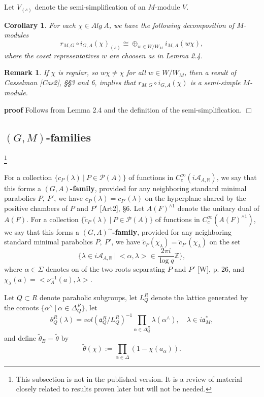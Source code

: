 \documentclass[12pt]{article}
\newtheorem{corollary}[lemma]{Corollary}
\newtheorem{remark}{Remark}
\newenvironment{pf}[1][proof:]{\par\medskip\noindent\textbf{#1} }{\par\medskip}
\begin{document}
Let $V_{(s)}$ denote the semi-simplification of an $M$-module $V$.

\begin{corollary}
For each $\chi\in Alg\ A$, we have the following decomposition of $M$-modules
\[
r_{M,G}\circ i_{G,A}(\chi)_{(s)}\cong\oplus_{w\in W/W_M}i_{M,A}(w\chi),
\]
where the coset representatives $w$ are choosen as in Lemma 2.4.
\end{corollary}

\begin{remark}
If $\chi$ is regular, so $w\chi\neq\chi$ for all $w\in W/W_M$, then a result of Casselman [Cas2], \S\S3 and 6, implies that $r_{M,G}\circ i_{G,A}(\chi)$ is a semi-simple $M$-module.
\end{remark}

\begin{pf}[proof]
Follows from Lemma 2.4 and the definition of the semi-simplification. $\Box$
\end{pf}

\subsection{$(G,M)$-families}
\footnote{This subsection is not in the published version. It is a review of material closely related to results proven later but will not be needed.}

For a collection $\{c_P(\lambda)\ |\ P\in\mathcal{P}(A)\}$ of functions in $C_c^\infty(i\mathcal{A}_{A,\mathbb{R}})$, we say that this forms a \textbf{$(G,A)$-family}, provided for any neighboring standard minimal parabolics $P,\ P'$, we have $c_P(\lambda)=c_{P'}(\lambda)$ on the hyperplane shared by the positive chambers of $P$ and $P'$ [Art2], \S6. Let $A(F)^{\wedge1}$ denote the unitary dual of $A(F)$. For a collection $\{\tilde{c}_P(\lambda)\ |\ P\in\mathcal{P}(A)\}$ of functions in $C_c^\infty(A(F)^{\wedge1})$, we say that this forms a \textbf{$(G,A)^\sim$-family}, provided for any neighboring standard minimal parabolics $P,\ P'$, we have $\tilde{c}_P(\chi_\lambda)=\tilde{c}_{P'}(\chi_\lambda)$ on the set
\[
\{\lambda\in i\mathcal{A}_{A,\mathbb{R}}\ |\ <\alpha,\lambda>\in\frac{2\pi i}{\log q}\mathbb{Z}\},
\]
where $\alpha\in\Sigma$ denotes on of the two roots separating $P$ and $P'$ [W], p. 26, and $\chi_\lambda(a)=<\nu_A^{-1}(a),\lambda>$.

Let $Q\subset R$ denote parabolic subgroups, let $L_Q^R$ denote the lattice generated by the coroots $\{\alpha^\wedge\ |\ \alpha\in\Delta_Q^R\}$, let
\begin{equation}\tag{2.16}
\theta_Q^R(\lambda)=vol(\mathfrak{a}_Q^R/L_Q^R)^{-1}\prod_{\alpha\in\Delta_Q^R}\lambda(\alpha^\wedge),\quad\lambda\in i\mathfrak{a}^*_M,
\end{equation}
and define $\tilde\theta_B=\tilde\theta$ by
\begin{equation}\tag{2.17}
\tilde\theta(\chi):=\prod_{\alpha\in\Delta}(1-\chi(a_\alpha)).
\end{equation}
\end{document}
